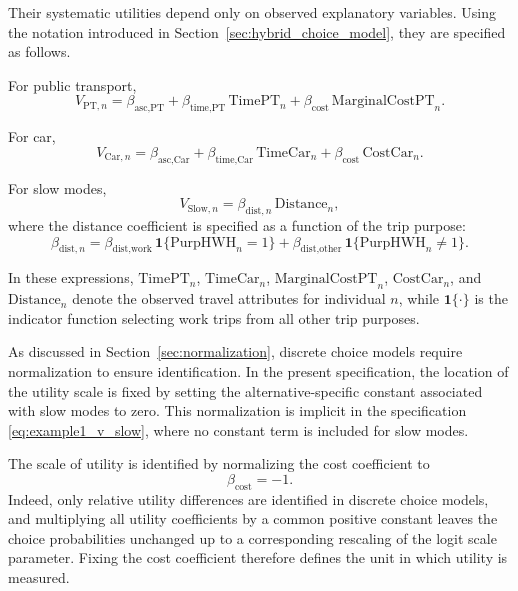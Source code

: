 \documentclass[12pt,a4paper]{article}
\newcommand{\PurpHWH}{\mathrm{PurpHWH}}
\newcommand{\TimeCar}{\mathrm{TimeCar}}
\newcommand{\TimePT}{\mathrm{TimePT}}
\newcommand{\CostCar}{\mathrm{CostCar}}
\newcommand{\MarginalCostPT}{\mathrm{MarginalCostPT}}
\newcommand{\distance}{\mathrm{Distance}}
\begin{document}
Their systematic utilities depend only on observed explanatory
variables. Using the notation introduced in
Section~\ref{sec:hybrid_choice_model}, they are specified as follows.

For public transport,
\begin{equation}
  \label{eq:example1_v_pt}
  V_{\text{PT},n} = \beta_{\text{asc,PT}} + \beta_{\text{time,PT}} \,
  \TimePT_n + \beta_{\text{cost}} \, \MarginalCostPT_n.
\end{equation}

For car,
\begin{equation}
  \label{eq:example1_v_car}
  V_{\text{Car},n} = \beta_{\text{asc,Car}} + \beta_{\text{time,Car}}
  \, \TimeCar_n + \beta_{\text{cost}} \, \CostCar_n.
\end{equation}

For slow modes,
\begin{equation}
  \label{eq:example1_v_slow}
  V_{\text{Slow},n} = \beta_{\text{dist},n} \, \distance_n,
\end{equation}
where the distance coefficient is specified as a function of the trip
purpose:
\begin{equation}
  \label{eq:example1_beta_dist}
  \beta_{\text{dist},n} = \beta_{\text{dist,work}} \, \mathbf{1}\{
  \PurpHWH_n = 1\} + \beta_{\text{dist,other}} \, \mathbf{1}\{
  \PurpHWH_n \neq 1\}.
\end{equation}

In these expressions, $\TimePT_n$, $\TimeCar_n$, $\MarginalCostPT_n$,
$\CostCar_n$, and $\distance_n$ denote the observed travel attributes
for individual $n$, while $\mathbf{1}\{\cdot\}$ is the indicator
function selecting work trips from all other trip purposes.

As discussed in Section~\ref{sec:normalization}, discrete choice
models require normalization to ensure identification. In the present
specification, the location of the utility scale is fixed by setting
the alternative-specific constant associated with slow modes to zero.
This normalization is implicit in the specification
\eqref{eq:example1_v_slow}, where no constant term is included for
slow modes.

The scale of utility is identified by normalizing the cost coefficient
to
\[
\beta_{\text{cost}}=-1.
\]
Indeed, only relative utility differences are identified in discrete
choice models, and multiplying all utility coefficients by a common
positive constant leaves the choice probabilities unchanged up to a
corresponding rescaling of the logit scale parameter. Fixing the cost
coefficient therefore defines the unit in which utility is measured.
\end{document}
